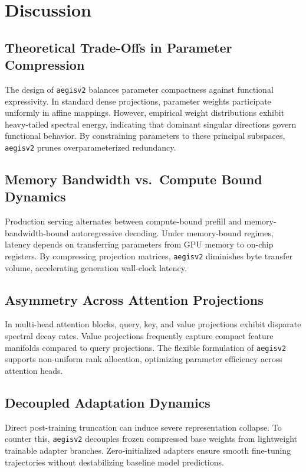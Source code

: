 \section{Discussion}

\subsection{Theoretical Trade-Offs in Parameter Compression}
The design of \texttt{aegisv2} balances parameter compactness against functional expressivity. In standard dense projections, parameter weights participate uniformly in affine mappings. However, empirical weight distributions exhibit heavy-tailed spectral energy, indicating that dominant singular directions govern functional behavior. By constraining parameters to these principal subspaces, \texttt{aegisv2} prunes overparameterized redundancy.

\subsection{Memory Bandwidth vs.\ Compute Bound Dynamics}
Production serving alternates between compute-bound prefill and memory-bandwidth-bound autoregressive decoding. Under memory-bound regimes, latency depends on transferring parameters from GPU memory to on-chip registers. By compressing projection matrices, \texttt{aegisv2} diminishes byte transfer volume, accelerating generation wall-clock latency.

\subsection{Asymmetry Across Attention Projections}
In multi-head attention blocks, query, key, and value projections exhibit disparate spectral decay rates. Value projections frequently capture compact feature manifolds compared to query projections. The flexible formulation of \texttt{aegisv2} supports non-uniform rank allocation, optimizing parameter efficiency across attention heads.

\subsection{Decoupled Adaptation Dynamics}
Direct post-training truncation can induce severe representation collapse. To counter this, \texttt{aegisv2} decouples frozen compressed base weights from lightweight trainable adapter branches. Zero-initialized adapters ensure smooth fine-tuning trajectories without destabilizing baseline model predictions.

